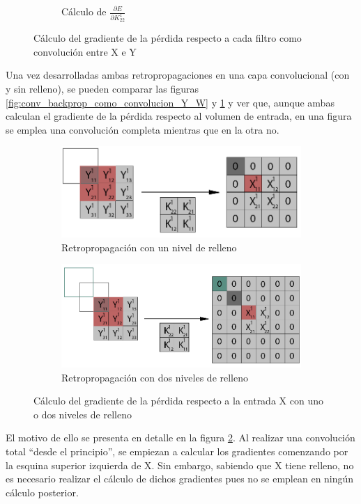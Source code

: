 \begin{figure}[H]
\begin{subfigure}{.5\textwidth}
		\caption{Cálculo de $\frac{\partial E}{\partial K^1_{22}}$}
	\end{subfigure}
	\caption{Cálculo del gradiente de la pérdida respecto a cada filtro como convolución entre X e Y}
	\label{fig:conv_backprop_como_convolucion_Y_K_pad}
\end{figure}

Una vez desarrolladas ambas retropropagaciones en una capa convolucional (con y sin relleno), se pueden comparar las figuras \ref{fig:conv_backprop_como_convolucion_Y_W} y \ref{fig:conv_backprop_como_convolucion_Y_K_pad} y ver que, aunque ambas calculan el gradiente de la pérdida respecto al volumen de entrada, en una figura se emplea una convolución completa mientras que en la otra no.


\begin{figure}[H]
	\centering
	\begin{subfigure}{.5\textwidth}
		\includegraphics[width=1.4\linewidth]{imagenes/full_vs_normal_conv_1.jpg}  
		\caption{Retropropagación con un nivel de relleno}
	\end{subfigure}
	
	\vspace{5mm}
	\begin{subfigure}{.5\textwidth}
		\includegraphics[width=1.4\linewidth]{imagenes/full_vs_normal_conv_2.jpg}  
		\caption{Retropropagación con dos niveles de relleno}
	\end{subfigure}
	\caption{Cálculo del gradiente de la pérdida respecto a la entrada X con uno o dos niveles de relleno}
	\label{fig:conv_full_vs_normal}
\end{figure}

El motivo de ello se presenta en detalle en la figura \ref{fig:conv_full_vs_normal}. Al realizar una convolución total ``desde el principio'', se empiezan a calcular los gradientes comenzando por la esquina superior izquierda de X. Sin embargo, sabiendo que X tiene relleno, no es necesario realizar el cálculo de dichos gradientes pues no se emplean en ningún cálculo posterior.
